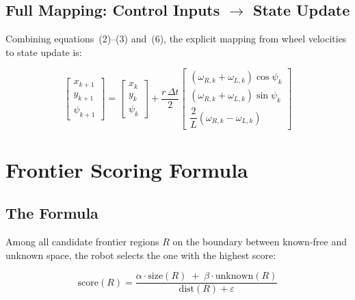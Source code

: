 \documentclass[12pt,a4paper]{article}
\begin{document}
\subsection{Full Mapping: Control Inputs $\to$ State Update}

Combining equations~(2)--(3) and~(6), the explicit mapping from
wheel velocities to state update is:

\begin{equation}
  \begin{bmatrix} x_{k+1} \\ y_{k+1} \\ \psi_{k+1} \end{bmatrix}
  =
  \begin{bmatrix} x_k \\ y_k \\ \psi_k \end{bmatrix}
  +
  \frac{r\,\Delta t}{2}
  \begin{bmatrix}
    (\omega_{R,k}+\omega_{L,k})\cos\psi_k \\
    (\omega_{R,k}+\omega_{L,k})\sin\psi_k \\
    \dfrac{2}{L}(\omega_{R,k}-\omega_{L,k})
  \end{bmatrix}
  \tag{8}
\end{equation}

\newpage
\section{Frontier Scoring Formula}

\subsection{The Formula}

Among all candidate frontier regions $R$ on the boundary between
known-free and unknown space, the robot selects the one with the highest score:

\begin{equation}
  \text{score}(R)
  = \frac{\alpha \cdot \text{size}(R) \;+\; \beta \cdot \text{unknown}(R)}
         {\text{dist}(R) + \varepsilon}
  \tag{9}
\end{equation}
\end{document}
